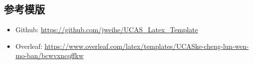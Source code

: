 \documentclass[12pt,hyperref,a4paper,UTF8]{ctexart}
\begin{document}
\subsection{参考模版}
\begin{itemize}
    \item Github: \url{https://github.com/jweihe/UCAS_Latex_Template}
    \item Overleaf:  \url{https://www.overleaf.com/latex/templates/UCASke-cheng-lun-wen-mo-ban/bcwvxncqffkw}
\end{itemize}


\end{document}
